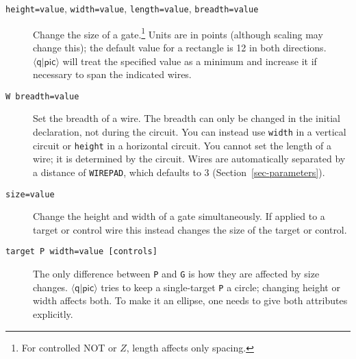 \documentclass[twoside,12pt]{article}
\newcommand{\qpic}{$\langle\mathsf{q}|\mathsf{pic}\rangle$\xspace}
\begin{document}
\begin{description}
\item[{\tt height=value}, {\tt width=value}, {\tt length=value}, {\tt breadth=value}] Change the size of a gate.\footnote{For controlled NOT or $Z$, length affects only spacing.}
Units are in points (although scaling may change this); the default value for a rectangle is 12 in both directions.
\qpic will treat the specified value as a minimum and increase it if necessary to span the indicated wires.

\begin{minipage}[b]{1.8in}

\end{minipage} \hfill  

\begin{minipage}[b]{1.8in}

\end{minipage} \hfill 

\item[{\tt W breadth=value}] Set the breadth of a wire.  The breadth can only be changed in the initial declaration, not during the circuit.  You can instead use {\tt width} in a vertical circuit or {\tt height} in a horizontal circuit.  You cannot set the length of a wire; it is determined by the circuit.
  Wires are automatically separated by a distance of {\tt WIREPAD}, which
  defaults to 3 (Section~\ref{sec-parameters}).

\begin{minipage}[b]{2in}

\end{minipage} \hfill 

\item[{\tt size=value}] Change the height and width of a gate simultaneously.
  If applied to a target or control wire this instead changes the size of
  the target or control.

\begin{minipage}[b]{2in}

\end{minipage} \hfill 
  
\item [{\tt target P width=value [controls]}] The only difference between
  {\tt P} and {\tt G} is how they are affected by size changes.
  \qpic tries to keep a single-target {\tt P} a circle; changing height or width
  affects both.  To make it an ellipse, one needs to give both
  attributes explicitly.

\begin{minipage}[b]{2in}

\end{minipage} \hfill 

  
\end{description}
\end{document}
